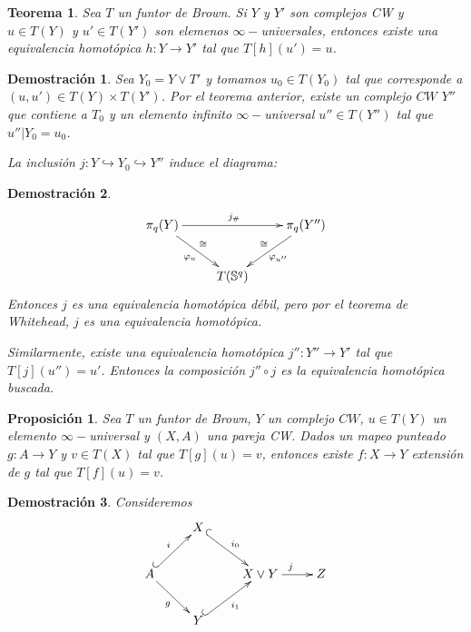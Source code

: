 \documentclass{beamer}
\newtheorem{teo}{Teorema}
\newtheorem{pro}{Proposici\'on}
\newtheorem{dem}{Demostraci\'on}
\begin{document}
\begin{frame}
	\begin{teo}
		Sea $T$ un funtor de Brown. Si $Y$ y $Y'$ son complejos CW y $u\in T(Y)$ y $u'\in T(Y')$ son elemenos $\infty-$universales, entonces existe una equivalencia homotópica $h\colon Y\to Y'$ tal que $T[h](u')=u$.
	\end{teo}
	
	\begin{dem}
		Sea $Y_0=Y\vee T'$ y tomamos $u_0\in T(Y_0)$ tal que corresponde a $(u,u')\in T(Y)\times T(Y')$. Por el teorema anterior, existe un complejo $CW$ $Y''$ que contiene a $T_0$ y un elemento infinito $\infty-$universal $u''\in T(Y'')$ tal que $u''|Y_0 = u_0$. 
		
		La inclusión $j\colon Y\hookrightarrow Y_0 \hookrightarrow Y''$ induce el diagrama:
		
	\end{dem}
\end{frame}

\begin{frame}
	\begin{dem}
		\[\xymatrix{
		\pi_q(Y)\ar[rr]^{j_\#} \ar[rd]_{\varphi_u}^\cong && \pi_q(Y'')\ar[ld]^{\varphi_{u''}}_\cong\\
		& T(\mathbb{S}^q)		
		}\]
		Entonces $j$ es una equivalencia homotópica débil, pero por el teorema de Whitehead, $j$ es una equivalencia homotópica.
		
		Similarmente, existe una equivalencia homotópica $j''\colon Y''\to Y'$ tal que $T[j](u'')=u'$. Entonces la composición $j''\circ j$ es la equivalencia homotópica buscada.
	\end{dem}
\end{frame}

\begin{frame}
	\begin{pro}
		Sea $T$ un funtor de Brown, $Y$ un complejo $CW$, $u\in T(Y)$ un elemento $\infty-$universal y $(X,A)$ una pareja CW. Dados un mapeo punteado $g\colon A\to Y$ y $v\in T(X)$ tal que $T[g](u)=v$, entonces existe $f\colon X\to Y$ extensión de $g$ tal que $T[f](u)=v$.
	\end{pro}
	
	\begin{dem}
		Consideremos
		\[\xymatrix{
			& X \ar@{^{(}->}[rd]^{i_0}& & \\
			A\ar@{^{(}->}[ru]^i \ar[rd]_g & & X\vee Y\ar[r]^j & Z\\
			& Y \ar@{^{(}->}[ru]_{i_1} & & 
		}\]
	\end{dem}
\end{frame}
\end{document}

